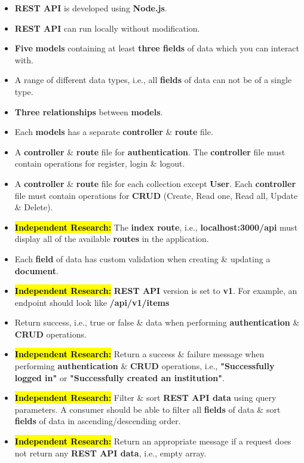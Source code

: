 \documentclass{article}
\begin{document}
\begin{itemize}
	\item \textbf{REST API} is developed using \textbf{Node.js}.
	\item \textbf{REST API} can run locally without modification.
	\item \textbf{Five} \textbf{models} containing at least \textbf{three fields} of data which you can interact with.
	\item A range of different data types, i.e., all \textbf{fields} of data can not be of a single type.
	\item \textbf{Three relationships} between \textbf{models}.
	\item Each \textbf{models} has a separate \textbf{controller} \& \textbf{route} file.
	\item A \textbf{controller} \& \textbf{route} file for \textbf{authentication}. The \textbf{controller} file must contain operations for register, login \& logout.
	\item A \textbf{controller} \& \textbf{route} file for each collection except \textbf{User}. Each \textbf{controller} file must contain operations for \textbf{CRUD} (Create, Read one, Read all, Update \& Delete).
	\item \hl{\textbf{Independent Research:}} The \textbf{index route}, i.e., \textbf{localhost:3000/api} must display all of the available \textbf{routes} in the application.
	\item Each \textbf{field} of data has custom validation when creating \& updating a \textbf{document}.
	\item \hl{\textbf{Independent Research:}} \textbf{REST API} version is set to \textbf{v1}. For example, an endpoint should look like \textbf{/api/v1/items}
	\item Return success, i.e., true or false \& data when performing \textbf{authentication} \& \textbf{CRUD} operations.
	\item \hl{\textbf{Independent Research:}} Return a success \& failure message when performing \textbf{authentication} \& \textbf{CRUD} operations, i.e., \textbf{"Successfully logged in"} or \textbf{"Successfully created an institution"}.
	\item \hl{\textbf{Independent Research:}} Filter \& sort \textbf{REST API data} using query parameters. A consumer should be able to filter all \textbf{fields} of data \& sort \textbf{fields} of data in ascending/descending order.
	\item \hl{\textbf{Independent Research:}} Return an appropriate message if a request does not return any \textbf{REST API data}, i.e., empty array.

\end{itemize}
\end{document}
